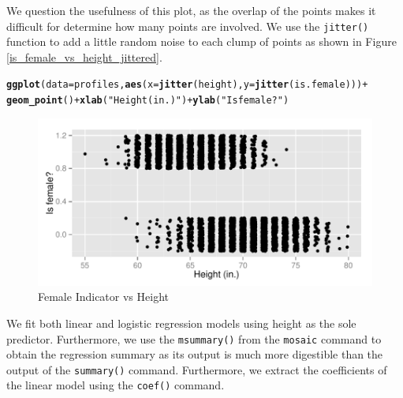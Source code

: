 \documentclass{article}\usepackage[]{graphicx}\usepackage[]{color}
\makeatletter
\def\maxwidth{ %
  \ifdim\Gin@nat@width>\linewidth
    \linewidth
  \else
    \Gin@nat@width
  \fi
}
\newcommand{\hlstr}[1]{\textcolor[rgb]{0.192,0.494,0.8}{#1}}%
\newcommand{\hlopt}[1]{\textcolor[rgb]{0,0,0}{#1}}%
\newcommand{\hlstd}[1]{\textcolor[rgb]{0.345,0.345,0.345}{#1}}%
\newcommand{\hlkwc}[1]{\textcolor[rgb]{0.333,0.667,0.333}{#1}}%
\newcommand{\hlkwd}[1]{\textcolor[rgb]{0.737,0.353,0.396}{\textbf{#1}}}%
\newenvironment{kframe}{%
 \def\at@end@of@kframe{}%
 \ifinner\ifhmode%
  \def\at@end@of@kframe{\end{minipage}}%
  \begin{minipage}{\columnwidth}%
 \fi\fi%
 \def\FrameCommand##1{\hskip\@totalleftmargin \hskip-\fboxsep
 \colorbox{shadecolor}{##1}\hskip-\fboxsep
     \hskip-\linewidth \hskip-\@totalleftmargin \hskip\columnwidth}%
 \MakeFramed {\advance\hsize-\width
   \@totalleftmargin\z@ \linewidth\hsize
   \@setminipage}}%
 {\par\unskip\endMakeFramed%
 \at@end@of@kframe}
\newenvironment{knitrout}{}{} %
\makeatother
\begin{document}
We question the usefulness of this plot, as the overlap of the points makes it difficult for determine how many points are involved.  We use the \verb#jitter()# function to add a little random noise to each clump of points as shown in Figure \ref{is_female_vs_height_jittered}.

\begin{knitrout}
\color{fgcolor}\begin{kframe}
\begin{alltt}
\hlkwd{ggplot}\hlstd{(}\hlkwc{data}\hlstd{=profiles,} \hlkwd{aes}\hlstd{(}\hlkwc{x}\hlstd{=}\hlkwd{jitter}\hlstd{(height),} \hlkwc{y}\hlstd{=}\hlkwd{jitter}\hlstd{(is.female)))} \hlopt{+}
  \hlkwd{geom_point}\hlstd{()} \hlopt{+} \hlkwd{xlab}\hlstd{(}\hlstr{"Height (in.)"}\hlstd{)} \hlopt{+} \hlkwd{ylab}\hlstd{(}\hlstr{"Is female?"}\hlstd{)}
\end{alltt}
\end{kframe}\begin{figure}

{\centering \includegraphics[width=\maxwidth]{figure/is_female_vs_height_jitered-1} 

}

\caption[Female Indicator vs Height]{Female Indicator vs Height}\label{fig:is_female_vs_height_jitered}
\end{figure}


\end{knitrout}

We fit both linear and logistic regression models using height as the sole predictor.  Furthermore, we use the \verb#msummary()# from the \verb#mosaic# command to obtain the regression summary as its output is much more digestible than the output of the \verb#summary()# command.  Furthermore, we extract the coefficients of the linear model using the \verb#coef()# command.
\end{document}
